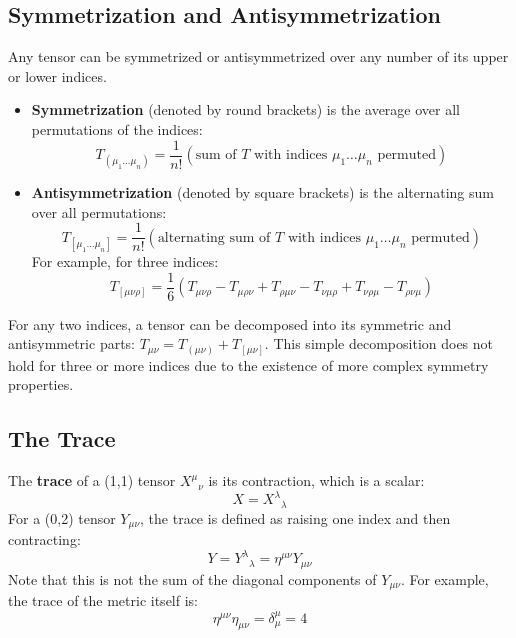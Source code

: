 \documentclass[11pt, a4paper]{report}
\begin{document}
\subsection*{Symmetrization and Antisymmetrization}

Any tensor can be symmetrized or antisymmetrized over any number of its upper or lower indices.
\begin{itemize}
    \item \textbf{Symmetrization} (denoted by round brackets) is the average over all permutations of the indices:
    \begin{equation}
        T_{(\mu_1 \dots \mu_n)} = \frac{1}{n!} (\text{sum of } T \text{ with indices } \mu_1 \dots \mu_n \text{ permuted})
    \end{equation}
    \item \textbf{Antisymmetrization} (denoted by square brackets) is the alternating sum over all permutations:
    \begin{equation}
        T_{[\mu_1 \dots \mu_n]} = \frac{1}{n!} (\text{alternating sum of } T \text{ with indices } \mu_1 \dots \mu_n \text{ permuted})
    \end{equation}
    For example, for three indices:
    \begin{equation}
        T_{[\mu\nu\rho]} = \frac{1}{6}(T_{\mu\nu\rho} - T_{\mu\rho\nu} + T_{\rho\mu\nu} - T_{\nu\mu\rho} + T_{\nu\rho\mu} - T_{\rho\nu\mu})
    \end{equation}
\end{itemize}
For any two indices, a tensor can be decomposed into its symmetric and antisymmetric parts: $T_{\mu\nu} = T_{(\mu\nu)} + T_{[\mu\nu]}$. This simple decomposition does not hold for three or more indices due to the existence of more complex symmetry properties.

\subsection*{The Trace}

The \textbf{trace} of a (1,1) tensor ${X^\mu}_\nu$ is its contraction, which is a scalar:
\begin{equation}
    X = {X^\lambda}_\lambda
\end{equation}
For a (0,2) tensor $Y_{\mu\nu}$, the trace is defined as raising one index and then contracting:
\begin{equation}
    Y = {Y^\lambda}_\lambda = \eta^{\mu\nu}Y_{\mu\nu}
\end{equation}
Note that this is not the sum of the diagonal components of $Y_{\mu\nu}$. For example, the trace of the metric itself is:
\begin{equation}
    \eta^{\mu\nu}\eta_{\mu\nu} = \delta^\mu_\mu = 4
\end{equation}
\end{document}

